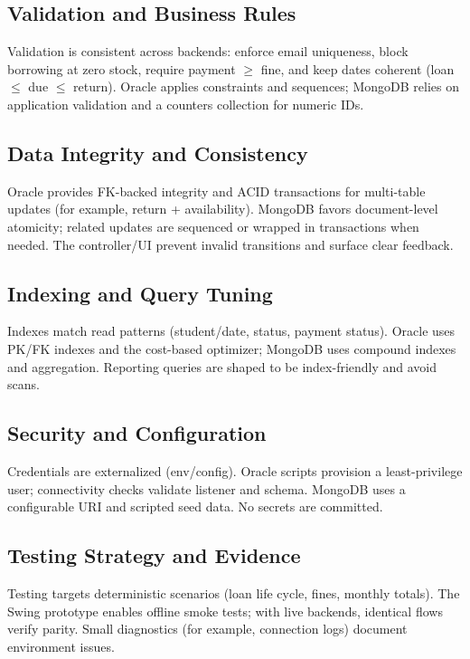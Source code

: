 \documentclass[12pt,a4paper]{article}
\begin{document}
\subsection{Validation and Business Rules}

Validation is consistent across backends: enforce email uniqueness, block borrowing at zero stock, require payment \(\ge\) fine, and keep dates coherent (loan \(\le\) due \(\le\) return). Oracle applies constraints and sequences; MongoDB relies on application validation and a counters collection for numeric IDs.

\subsection{Data Integrity and Consistency}

Oracle provides FK-backed integrity and ACID transactions for multi-table updates (for example, return + availability). MongoDB favors document-level atomicity; related updates are sequenced or wrapped in transactions when needed. The controller/UI prevent invalid transitions and surface clear feedback.

\subsection{Indexing and Query Tuning}

Indexes match read patterns (student/date, status, payment status). Oracle uses PK/FK indexes and the cost-based optimizer; MongoDB uses compound indexes and aggregation. Reporting queries are shaped to be index-friendly and avoid scans.

\subsection{Security and Configuration}

Credentials are externalized (env/config). Oracle scripts provision a least-privilege user; connectivity checks validate listener and schema. MongoDB uses a configurable URI and scripted seed data. No secrets are committed.

\subsection{Testing Strategy and Evidence}

Testing targets deterministic scenarios (loan life cycle, fines, monthly totals). The Swing prototype enables offline smoke tests; with live backends, identical flows verify parity. Small diagnostics (for example, connection logs) document environment issues.
\end{document}
